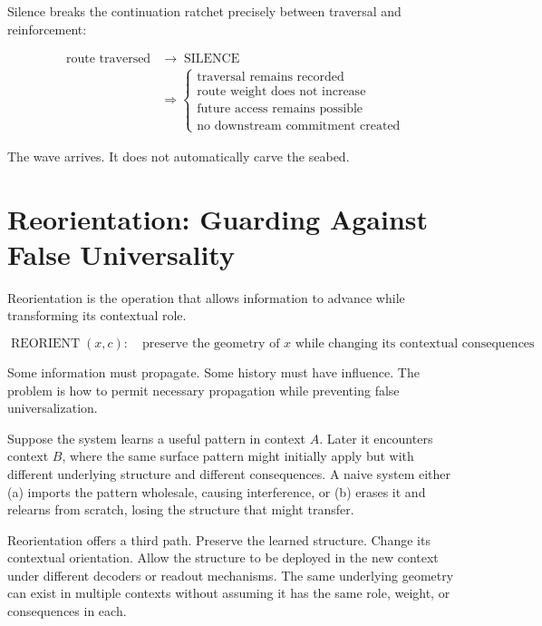\documentclass[12pt]{article}
\begin{document}
Silence breaks the continuation ratchet precisely between traversal and reinforcement:

\begin{equation}
\begin{aligned}
\text{route traversed} &\rightarrow \operatorname{SILENCE} \\
&\Rightarrow \begin{cases}
\text{traversal remains recorded}\\
\text{route weight does not increase}\\
\text{future access remains possible}\\
\text{no downstream commitment created}
\end{cases}
\end{aligned}
\end{equation}

The wave arrives. It does not automatically carve the seabed.

\section{Reorientation: Guarding Against False Universality}

Reorientation is the operation that allows information to advance while transforming its contextual role.

\begin{equation}
\operatorname{REORIENT}(x, c): \quad \text{preserve the geometry of } x \text{ while changing its contextual consequences}
\end{equation}

Some information must propagate. Some history must have influence. The problem is how to permit necessary propagation while preventing false universalization.

Suppose the system learns a useful pattern in context $A$. Later it encounters context $B$, where the same surface pattern might initially apply but with different underlying structure and different consequences. A naive system either (a) imports the pattern wholesale, causing interference, or (b) erases it and relearns from scratch, losing the structure that might transfer.

Reorientation offers a third path. Preserve the learned structure. Change its contextual orientation. Allow the structure to be deployed in the new context under different decoders or readout mechanisms. The same underlying geometry can exist in multiple contexts without assuming it has the same role, weight, or consequences in each.
\end{document}
